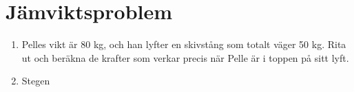 \documentclass[12pt]{article}
\begin{document}
\setcounter{section}{1}
\section{Jämviktsproblem}

\begin{enumerate}
        \item
              \begin{minipage}[t]{0.6\textwidth}
                      Pelles vikt är 80 kg, och han lyfter en skivstång som totalt väger 50 kg. Rita ut och beräkna de krafter som verkar precis när Pelle är i toppen på sitt lyft.
              \end{minipage}
              \hfill
              \begin{minipage}{0.3\textwidth}
              \end{minipage}
        \item
              \begin{minipage}[t]{0.6\textwidth}
                      Stegen
              \end{minipage}
              \hfill
              \begin{minipage}{0.3\textwidth}
                      
              \end{minipage}
\end{enumerate}
\end{document}
